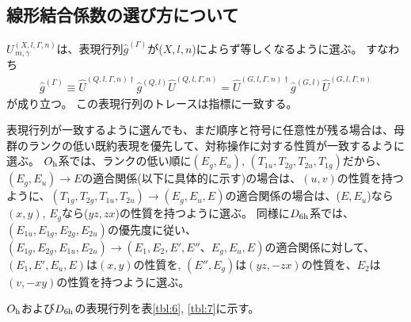 \documentclass[11pt]{easymemo}
\begin{document}
\subsection{線形結合係数の選び方について}

$U_{\,m,\gamma}^{(X,l,\Gamma,n)}$は、表現行列$\hat{g}^{(\Gamma)}$が($X,l,n$)によらず等しくなるように選ぶ。
すなわち
\begin{align}
\hat{g}^{(\Gamma)}\equiv\hat{U}^{(Q,l,\Gamma,n)\dagger}\hat{g}^{(Q,l)}\hat{U}^{(Q,l,\Gamma,n)}
=
\hat{U}^{(G,l,\Gamma,n)\dagger}\hat{g}^{(G,l)}\hat{U}^{(G,l,\Gamma,n)}
\end{align}
が成り立つ。
この表現行列のトレースは指標に一致する。

表現行列が一致するように選んでも、まだ順序と符号に任意性が残る場合は、母群のランクの低い既約表現を優先して、対称操作に対する性質が一致するように選ぶ。
$O_{\rm h}$系では、ランクの低い順に$(E_{g},E_{u})$, $(T_{1u},T_{2g},T_{2u},T_{1g})$だから、$(E_{g},E_{u})\to E$の適合関係(以下に具体的に示す)の場合は、$(u,v)$の性質を持つように、$(T_{1g},T_{2g},T_{1u},T_{2u})\to(E_{g},E_{u},E)$の適合関係の場合は、($E,E_{u}$)なら$(x,y)$, $E_{g}$なら($yz,zx$)の性質を持つように選ぶ。
同様に$D_{\rm 6h}$系では、$(E_{1u},E_{1g},E_{2g},E_{2u})$の優先度に従い、$(E_{1g},E_{2g},E_{1u},E_{2u})\to(E_{1},E_{2},E',E''、E_{g},E_{u},E)$の適合関係に対して、$(E_{1},E',E_{u},E)$は$(x,y)$の性質を, $(E'',E_{g})$は$(yz,-zx)$の性質を、$E_{2}$は$(v,-xy)$の性質を持つように選ぶ。

$O_{\rm h}$および$D_{\rm 6h}$の表現行列を表\ref{tbl:6}, \ref{tbl:7}に示す。
\end{document}
